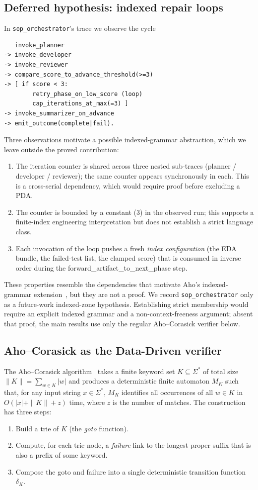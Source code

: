 \subsection{Deferred hypothesis: indexed repair loops}

In \texttt{sop\_orchestrator}'s trace we observe the cycle
\begin{verbatim}
   invoke_planner
-> invoke_developer
-> invoke_reviewer
-> compare_score_to_advance_threshold(>=3)
-> [ if score < 3:
        retry_phase_on_low_score (loop)
        cap_iterations_at_max(=3) ]
-> invoke_summarizer_on_advance
-> emit_outcome(complete|fail).
\end{verbatim}
Three observations motivate a possible indexed-grammar abstraction,
which we leave outside the proved contribution:
\begin{enumerate}
\item The iteration counter is shared across three nested
sub-traces (planner / developer / reviewer); the same counter
appears synchronously in each.  This is a cross-serial
dependency, which would require proof before excluding a PDA.
\item The counter is bounded by a constant (3) in the observed run;
this supports a finite-index engineering interpretation but does not
establish a strict language class.
\item Each invocation of the loop pushes a fresh \emph{index
configuration} (the EDA bundle, the failed-test list, the
clamped score) that is consumed in inverse order during the
\textsf{forward\_artifact\_to\_next\_phase} step.
\end{enumerate}

These properties resemble the dependencies that motivate Aho's
indexed-grammar extension~\cite{aho1968indexed}, but they are not
a proof.  We record \texttt{sop\_orchestrator} only as a future-work
indexed-zone hypothesis.  Establishing strict membership would
require an explicit indexed grammar and a non-context-freeness
argument; absent that proof, the main results use only the regular
Aho--Corasick verifier below.

\subsection{Aho--Corasick as the Data-Driven verifier}

The Aho--Corasick algorithm~\cite{aho1975corasick} takes a
finite keyword set $K\subseteq \Sigma^*$ of total size $\|K\| =
\sum_{w\in K}|w|$ and produces a deterministic finite automaton
$M_K$ such that, for any input string $x\in\Sigma^*$, $M_K$
identifies all occurrences of all $w\in K$ in $O(|x| + \|K\| +
z)$ time, where $z$ is the number of matches.  The construction
has three steps:
\begin{enumerate}
\item Build a trie of $K$ (the \emph{goto} function).
\item Compute, for each trie node, a \emph{failure} link to the
longest proper suffix that is also a prefix of some keyword.
\item Compose the goto and failure into a single deterministic
transition function $\delta_K$.
\end{enumerate}

